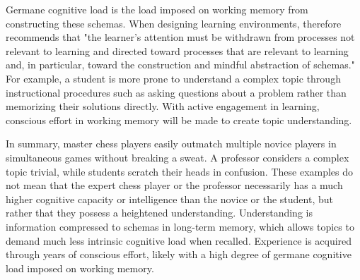 Germane cognitive load is the load imposed on working memory from constructing these schemas. When designing learning environments, \textcite{sweller1988} therefore recommends that "the learner's attention must be withdrawn from processes not relevant to learning and directed toward processes that are relevant to learning and, in particular, toward the construction and mindful abstraction of schemas." For example, a student is more prone to understand a complex topic through instructional procedures such as asking questions about a problem rather than memorizing their solutions directly. 
With active engagement in learning, conscious effort in working memory will be made to create topic understanding. 

In summary, master chess players easily outmatch multiple novice players in simultaneous games without breaking a sweat. A professor considers a complex topic trivial, while students scratch their heads in confusion. 
These examples do not mean that the expert chess player or the professor necessarily has a much higher cognitive capacity or intelligence than the novice or the student, but rather that they possess a heightened understanding. Understanding is information compressed to schemas in long-term memory, which allows topics to demand much less intrinsic cognitive load when recalled. Experience is acquired through years of conscious effort, likely with a high degree of germane cognitive load imposed on working memory.

\FloatBarrier